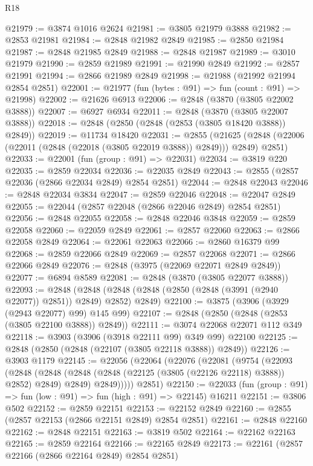 \begin{lexlean}{R18}
\begin{coremodule}
@21979 := @3874 @1016 @2624
@21981 := @3805 @21979 @3888
@21982 := @2853 @21981
@21984 := @2848 @21982 @2849
@21985 := @2850 @21984
@21987 := @2848 @21985 @2849
@21988 := @2848 @21987
@21989 := @3010 @21979
@21990 := @2859 @21989
@21991 := @21990 @2849
@21992 := @2857 @21991
@21994 := @2866 @21989 @2849
@21998 := @21988 (@21992 @21994 @2854 @2851)
@22001 := @21977 (fun (bytes : @91) => fun (count : @91) => @21998)
@22002 := @21626 @6913
@22006 := @2848 (@3870 (@3805 @22002 @3888))
@22007 := @6927 @6934
@22011 := @2848 (@3870 (@3805 @22007 @3888))
@22018 := @2848 (@2850 (@2848 (@2853 (@3805 @18420 @3888)) @2849))
@22019 := @11734 @18420
@22031 := @2855
    (@21625 (@2848 (@22006 (@22011 (@2848 (@22018 (@3805 @22019 @3888)) @2849))) @2849) @2851)
@22033 := @22001 (fun (group : @91) => @22031)
@22034 := @3819 @220
@22035 := @2859 @22034
@22036 := @22035 @2849
@22043 := @2855 (@2857 @22036 (@2866 @22034 @2849) @2854 @2851)
@22044 := @2848 @22043
@22046 := @2848 @22034 @3834
@22047 := @2859 @22046
@22048 := @22047 @2849
@22055 := @22044 (@2857 @22048 (@2866 @22046 @2849) @2854 @2851)
@22056 := @2848 @22055
@22058 := @2848 @22046 @3848
@22059 := @2859 @22058
@22060 := @22059 @2849
@22061 := @2857 @22060
@22063 := @2866 @22058 @2849
@22064 := @22061 @22063
@22066 := @2860 @16379 @99
@22068 := @2859 @22066 @2849
@22069 := @2857 @22068
@22071 := @2866 @22066 @2849
@22076 := @2848 (@3975 (@22069 @22071 @2849 @2849))
@22077 := @6894 @8589
@22081 := @2848 (@3870 (@3805 @22077 @3888))
@22093 := @2848
    (@2848 (@2848 (@2848 (@2850 (@2848 (@3991 (@2940 @22077)) @2851)) @2849) @2852) @2849)
@22100 := @3875 (@3906 (@3929 (@2943 @22077) @99) @145 @99)
@22107 := @2848 (@2850 (@2848 (@2853 (@3805 @22100 @3888)) @2849))
@22111 := @3074 @22068 @22071 @112 @349
@22118 := @3903 (@3906 (@3918 @22111 @99) @349 @99) @22100
@22125 := @2848 (@2850 (@2848 (@22107 (@3805 @22118 @3888)) @2849))
@22126 := @3903 @1179
@22145 := @22056
    (@22064
      (@22076
        (@22081
          (@9754
            (@22093
              (@2848
                (@2848 (@2848 (@2848 (@22125 (@3805 (@22126 @22118) @3888)) @2852) @2849) @2849)
                @2849)))))
      @2851)
@22150 := @22033 (fun (group : @91) => fun (low : @91) => fun (high : @91) => @22145) @16211
@22151 := @3806 @502
@22152 := @2859 @22151
@22153 := @22152 @2849
@22160 := @2855 (@2857 @22153 (@2866 @22151 @2849) @2854 @2851)
@22161 := @2848 @22160
@22162 := @2848 @22151
@22163 := @3819 @502
@22164 := @22162 @22163
@22165 := @2859 @22164
@22166 := @22165 @2849
@22173 := @22161 (@2857 @22166 (@2866 @22164 @2849) @2854 @2851)

\end{coremodule}
\end{lexlean}
